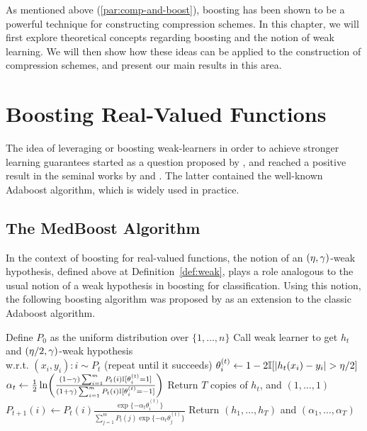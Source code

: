 \documentclass[12pt,a4paper,oneside,onecolumn]{book}
\def\hspace#1{}%
\begin{document}
As mentioned above (\ref{par:comp-and-boost}), boosting has been shown to be a powerful technique for constructing compression schemes. In this chapter, we will first explore theoretical concepts regarding boosting and the notion of weak learning. We will then show how these ideas can be applied to the construction of compression schemes, and present our main results in this area. 

\section{Boosting Real-Valued Functions}
\label{subsec:real-boosting}


The idea of leveraging or boosting weak-learners in order to achieve
stronger learning guarantees started as a question
proposed by \citeauthor{k-thb-88},
and reached a positive result in the seminal works
by \cite{DBLP:journals/ml/Schapire90}
and \cite{FreundSchapire97}.
The latter contained the well-known Adaboost algorithm,
which is widely used in practice.





\subsection{The MedBoost Algorithm}

In the context of boosting for real-valued functions, 
the notion of an $(\eta,\gamma)$-weak hypothesis, defined above at Definition~\ref{def:weak}, plays a role analogous to the usual notion of a weak hypothesis in boosting for classification.
Using this notion, the following boosting algorithm was proposed by \citet{kegl2003robust}
as an extension to the classic Adaboost algorithm.

\begin{algorithm}[ht]
\label{alg:medboost}
\caption{($\{(x_i,y_i)\}_{i\in[m]}$,$T$,$\adv$,$\dev$)}
\begin{algorithmic}[1]
\State Define $P_{0}$ as the uniform distribution over $\{1,\ldots,n\}$
    \State Call weak learner to get $h_{t}$ and $(\eta/2,\gamma)$-weak hypothesis \\ 
    \hspace{0.625cm} w.r.t. $(x_{i},y_{i})\! :\! i \!\sim\! P_{t}$ (repeat until it succeeds)
        \State $\theta_{i}^{(t)} \gets 1 - 2 \mathbb{I}[ |h_{t}(x_{i}) - y_{i}| > \eta/2 ]$
    \EndFor
    \State $\alpha_{t} \gets \frac{1}{2} \ln\!\left( \frac{ (1-\gamma) \sum_{i=1}^{m} P_{t}(i) \mathbb{I}[ \theta_{i}^{(t)} = 1 ] }{ (1+\gamma) \sum_{i=1}^{m} P_{t}(i) \mathbb{I}[ \theta_{i}^{(t)} = -1 ] } \right)$
        \State Return $T$ copies of $h_{t}$, and $(1,\ldots,1)$
    \EndIf
        \State $P_{t+1}(i) \gets P_{t}(i) \frac{\exp\{-\alpha_{t}\theta_{i}^{(t)}\}}{\sum_{j=1}^{m} P_{t}(j) \exp\{-\alpha_{t}\theta_{j}^{(t)}\}}$
    \EndFor
\EndFor
\State Return $(h_{1},\ldots,h_{T})$ and $(\alpha_{1},\ldots,\alpha_{T})$
\end{algorithmic}
\end{algorithm}
\end{document}
